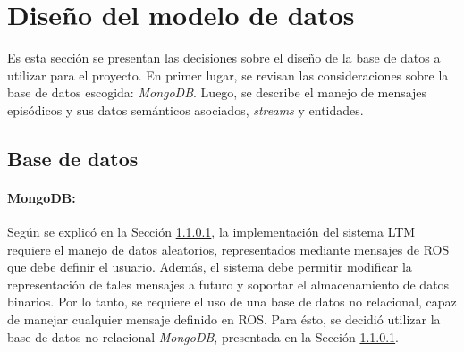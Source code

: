 






\section{Diseño del modelo de datos}

Es esta sección se presentan las decisiones sobre el diseño de la base de datos a utilizar para el proyecto. En primer lugar, se revisan las consideraciones sobre la base de datos escogida: \textit{MongoDB}. Luego, se describe el manejo de mensajes episódicos y sus datos semánticos asociados, \textit{streams} y entidades.


\subsection{Base de datos}

\paragraph{MongoDB:}
Según se explicó en la Sección \ref{}, la implementación del sistema LTM requiere el manejo de datos aleatorios, representados mediante mensajes de ROS que debe definir el usuario. Además, el sistema debe permitir modificar la representación de tales mensajes a futuro y soportar el almacenamiento de datos binarios. Por lo tanto, se requiere el uso de una base de datos no relacional, capaz de manejar cualquier mensaje definido en ROS. Para ésto, se decidió utilizar la base de datos no relacional \textit{MongoDB}, presentada en la Sección \ref{}. 

